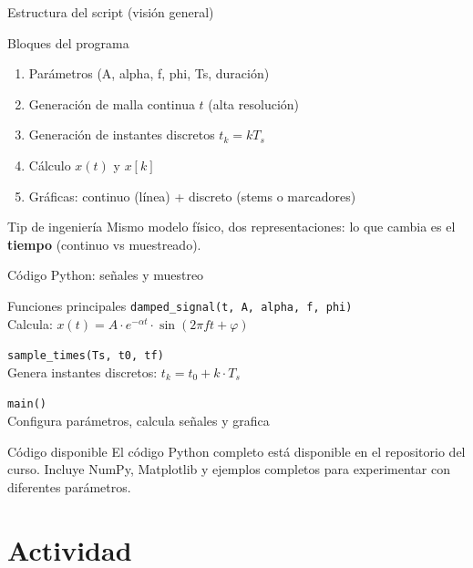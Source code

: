 \documentclass[aspectratio=169,10pt]{beamer}
\newcommand{\importantbox}[2][Importante]{%
\begin{alertblock}{#1}#2\end{alertblock}}
\begin{document}
\begin{frame}{Estructura del script (visión general)}
\small
\begin{block}{Bloques del programa}
\begin{enumerate}
\item Parámetros (A, alpha, f, phi, Ts, duración)
\item Generación de malla continua $t$ (alta resolución)
\item Generación de instantes discretos $t_k=kT_s$
\item Cálculo $x(t)$ y $x[k]$
\item Gráficas: continuo (línea) + discreto (stems o marcadores)
\end{enumerate}
\end{block}

\importantbox[Tip de ingeniería]{
Mismo modelo físico, dos representaciones: lo que cambia es el \textbf{tiempo} (continuo vs muestreado).
}
\end{frame}

\begin{frame}[fragile]{Código Python: señales y muestreo}
\small
\begin{block}{Funciones principales}
\texttt{damped\_signal(t, A, alpha, f, phi)}\\
\quad Calcula: $x(t) = A \cdot e^{-\alpha t} \cdot \sin(2\pi f t + \varphi)$

\vspace{2mm}
\texttt{sample\_times(Ts, t0, tf)}\\
\quad Genera instantes discretos: $t_k = t_0 + k \cdot T_s$

\vspace{2mm}
\texttt{main()}\\
\quad Configura parámetros, calcula señales y grafica
\end{block}

\importantbox[Código disponible]{
El código Python completo está disponible en el repositorio del curso. Incluye NumPy, Matplotlib y ejemplos completos para experimentar con diferentes parámetros.
}
\end{frame}

\section{Actividad}
\end{document}
